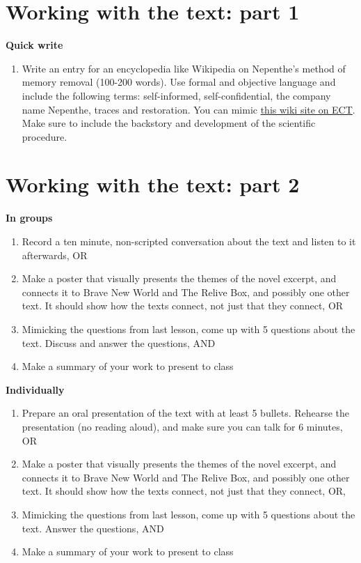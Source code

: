 \documentclass[11pt,a4paper,oneside]{book}
\newcommand{\tasktitle}[1]{{\color{blue}\bfseries #1}\par\smallskip}
\begin{document}
\section*{Working with the text: part 1}
\begin{taskbox}
\tasktitle{Quick write}
\begin{enumerate}
\item Write an entry for an encyclopedia like Wikipedia on Nepenthe’s method of memory removal (100-200 words). Use formal and objective language and include the following terms: self-informed, self-confidential, the company name Nepenthe, traces and restoration. You can mimic \href{https://en.wikipedia.org/wiki/Electroconvulsive_therapy}{this wiki site on ECT}.
Make sure to include the backstory and development of the scientific procedure.
\end{enumerate}
\end{taskbox}

\section*{Working with the text: part 2}
\begin{taskbox}
\tasktitle{In groups}
\begin{enumerate}
\item Record a ten minute, non-scripted conversation about the text and listen to it afterwards, OR
\item Make a poster that visually presents the themes of the novel excerpt, and connects it to Brave New World and The Relive Box, and possibly one other text. It should show how the texts connect, not just that they connect, OR
\item Mimicking the questions from last lesson, come up with 5 questions about the text. Discuss and answer the questions, AND
\item Make a summary of your work to present to class
\end{enumerate}
\end{taskbox}
\begin{taskbox}
\tasktitle{Individually}
\begin{enumerate}
\item Prepare an oral presentation of the text with at least 5 bullets. Rehearse the presentation (no reading aloud), and make sure you can talk for 6 minutes, OR
\item Make a poster that visually presents the themes of the novel excerpt, and connects it to Brave New World and The Relive Box, and possibly one other text. It should show how the texts connect, not just that they connect, OR,
\item Mimicking the questions from last lesson, come up with 5 questions about the text. Answer the questions, AND
\item Make a summary of your work to present to class
\end{enumerate}
\end{taskbox}
\end{document}
